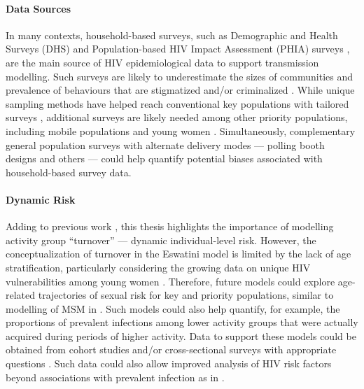 \paragraph{Data Sources}
In many contexts, household-based surveys, such as
Demographic and Health Surveys (DHS) \cite{DHS} and
Population-based HIV Impact Assessment (PHIA) surveys \cite{PHIA},
are the main source of HIV epidemiological data to support transmission modelling.
Such surveys are likely to underestimate
the sizes of communities and prevalence of behaviours that are stigmatized and/or criminalized
\cite{Fenton2001,Mishra2008,Lowndes2012,Behanzin2013}.
While unique sampling methods have helped
reach conventional key populations with tailored surveys \cite{UNAIDS2010kps,UNAIDSKPA},
additional surveys are likely needed among other priority populations,
including mobile populations and young women \cite{Akullian2017,Camlin2019,Cheuk2020}.
Simultaneously, complementary general population surveys with alternate delivery modes
--- \eg polling booth designs \cite{Lowndes2012,Behanzin2013} and others \cite{Langhaug2010} ---
could help quantify potential biases associated with household-based survey data.
\paragraph{Dynamic Risk}
Adding to previous work \cite{Henry2015,Knight2020},
this thesis highlights the importance of modelling activity group ``turnover''
--- \ie dynamic individual-level risk.
However, the conceptualization of turnover in the Eswatini model
is limited by the lack of age stratification, particularly considering
the growing data on unique HIV vulnerabilities among young women \cite{Wamoyi2016,Cheuk2020,Ma2020}.
Therefore, future models could explore age-related trajectories of sexual risk
for key and priority populations, similar to modelling of MSM in \cite{Rozhnova2019,Basten2021}.
Such models could also help quantify, for example,
the proportions of prevalent infections among lower activity groups
that were actually acquired during periods of higher activity.
Data to support these models could be obtained from
cohort studies and/or cross-sectional surveys with appropriate questions
\cite{McKinnon2014,McKinnon2015,Olawore2018}.
Such data could also allow improved analysis of HIV risk factors
beyond associations with prevalent infection as in .
